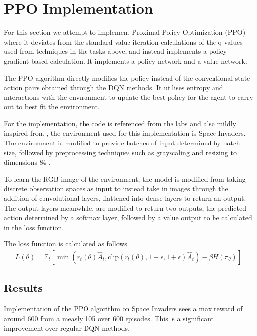 \renewcommand{\thesection}{Extra Task}
\section{PPO Implementation}

For this section we attempt to implement Proximal Policy Optimization (PPO) where it deviates from the standard value-iteration calculations of the q-values used from techniques in the tasks above, and instead implements a policy gradient-based calculation. It implements a policy network and a value network. 

The PPO algorithm directly modifies the policy instead of the conventional state-action pairs obtained through the DQN methods. It utilises entropy and interactions with the environment to update the best policy for the agent to carry out to best fit the environment.

For the implementation, the code is referenced from the labs and also mildly inspired from \cite{PPO_Github}, the environment used for this implementation is Space Invaders. The environment is modified to provide batches of input determined by batch size, followed by preprocessing techniques such as grayscaling and resizing to dimensions 84 . 

To learn the RGB image of the environment, the model is modified from taking discrete observation spaces as input to instead take in images through the addition of convolutional layers, flattened into dense layers to return an output. The output layers meanwhile, are modified to return two outputs, the predicted action determined by a softmax layer, followed by a value output to be calculated in the loss function.

The loss function is calculated as follows:
\begin{align*}
   L(\theta) = \mathbb{E}_t \left[ \min \left( r_t(\theta) \hat{A}_t, \text{clip}(r_t(\theta), 1 - \epsilon, 1 + \epsilon) \hat{A}_t \right) - \beta H(\pi_{\theta}) \right] 
\end{align*}

\subsection{Results}
Implementation of the PPO algorithm on Space Invaders sees a max reward of around 600 from a measly 105 over 600 episodes. This is a significant improvement over regular DQN methods.